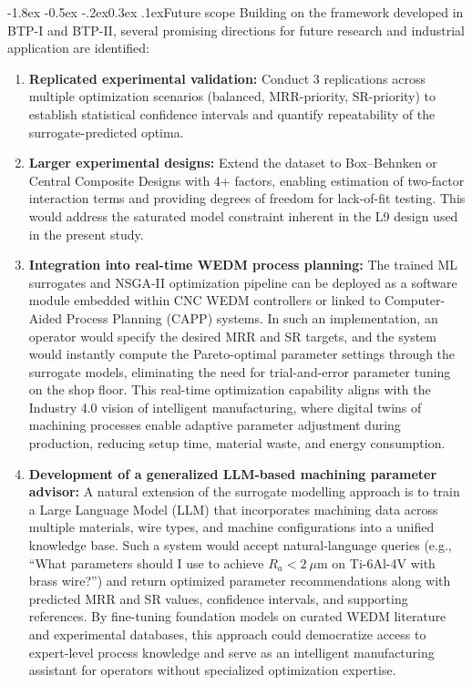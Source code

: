 \documentclass[12pt, a4paper]{report}
\makeatletter
\renewcommand{\section}{\@startsection{section}{1}{\z@}%
  {-1.8ex \@plus -0.5ex \@minus -.2ex}{0.3ex \@plus.1ex}{\normalfont\bfseries}}
\makeatother
\begin{document}
\section{Future scope}
Building on the framework developed in BTP-I and BTP-II, several promising directions for future research and industrial application are identified:

\begin{enumerate}[topsep=2pt, itemsep=4pt]
    \item \textbf{Replicated experimental validation:} Conduct 3 replications across multiple optimization scenarios (balanced, MRR-priority, SR-priority) to establish statistical confidence intervals and quantify repeatability of the surrogate-predicted optima.

    \item \textbf{Larger experimental designs:} Extend the dataset to Box--Behnken or Central Composite Designs with 4+ factors, enabling estimation of two-factor interaction terms and providing degrees of freedom for lack-of-fit testing. This would address the saturated model constraint inherent in the L9 design used in the present study.

    \item \textbf{Integration into real-time WEDM process planning:} The trained ML surrogates and NSGA-II optimization pipeline can be deployed as a software module embedded within CNC WEDM controllers or linked to Computer-Aided Process Planning (CAPP) systems. In such an implementation, an operator would specify the desired MRR and SR targets, and the system would instantly compute the Pareto-optimal parameter settings through the surrogate models, eliminating the need for trial-and-error parameter tuning on the shop floor. This real-time optimization capability aligns with the Industry 4.0 vision of intelligent manufacturing, where digital twins of machining processes enable adaptive parameter adjustment during production, reducing setup time, material waste, and energy consumption.

    \item \textbf{Development of a generalized LLM-based machining parameter advisor:} A natural extension of the surrogate modelling approach is to train a Large Language Model (LLM) that incorporates machining data across multiple materials, wire types, and machine configurations into a unified knowledge base. Such a system would accept natural-language queries (e.g., ``What parameters should I use to achieve $R_a < 2~\mu$m on Ti-6Al-4V with brass wire?'') and return optimized parameter recommendations along with predicted MRR and SR values, confidence intervals, and supporting references. By fine-tuning foundation models on curated WEDM literature and experimental databases, this approach could democratize access to expert-level process knowledge and serve as an intelligent manufacturing assistant for operators without specialized optimization expertise.


\end{enumerate}
\end{document}
